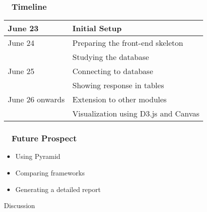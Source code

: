 \documentclass[xcolor={dvipsnames}]{beamer}
\begin{document}
\begin{frame}
\frametitle{ ~ Timeline}
\begin{center}
\begin{tabular}{|l|l|}
     \hline
     June 23 & Initial Setup\\
     \hline
     June 24 & Preparing the front-end skeleton\\
     \hline & Studying the database\\
     \hline
     June 25 & Connecting to database\\
     \hline & Showing response in tables\\
     \hline
     June 26 onwards & Extension to other modules\\
     \hline
     & Visualization using D3.js and Canvas\\
     \hline
     
\end{tabular}
\end{center}    
\end{frame}

\begin{frame}
\frametitle{ ~ Future Prospect} 
\begin{itemize}
\item{Using Pyramid}
\item{Comparing frameworks}
\item{Generating a detailed report}
\end{itemize}
\end{frame}



\begin{frame}
\begin{center}
\Huge{Discussion}
\end{center}
\end{frame}

\end{document}
